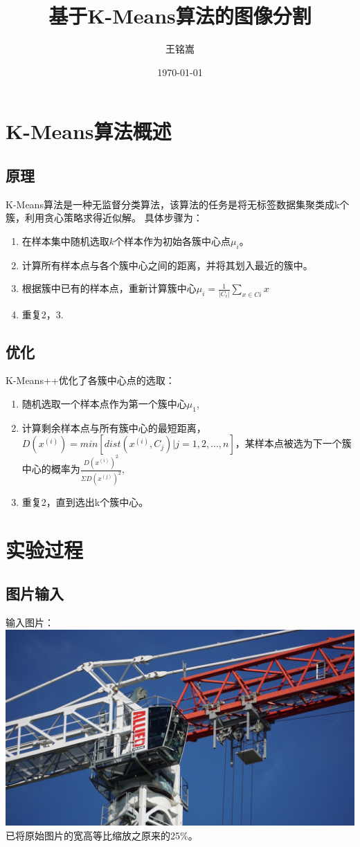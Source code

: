 \documentclass{article}
\title{基于K-Means算法的图像分割}
\author{王铭嵩}
\date{\today}
\begin{document}
\maketitle
\section{K-Means算法概述}
\subsection{原理}
K-Means算法是一种无监督分类算法，该算法的任务是将无标签数据集聚类成k个簇，利用贪心策略求得近似解。
具体步骤为：
\begin{enumerate}
    \item 在样本集中随机选取$k$个样本作为初始各簇中心点$\mu_{i}$。
    \item 计算所有样本点与各个簇中心之间的距离，并将其划入最近的簇中。
    \item 根据簇中已有的样本点，重新计算簇中心$\mu_{i}=\frac{1}{|C_{i}|}\sum_{x\in{C{i}}}x$
    \item 重复2，3.
\end{enumerate}
\subsection{优化}
K-Means++优化了各簇中心点的选取：
\begin{enumerate}
    \item 随机选取一个样本点作为第一个簇中心$\mu_1$,
    \item 计算剩余样本点与所有簇中心的最短距离，$D(x^{(i)})=min[dist(x^{(i)},C_j)|j=1,2,...,n]$，某样本点被选为下一个簇中心的概率为$\frac{D(x^{(i)})^2}{\Sigma D(x^{(j)})^2}$,
    \item 重复2，直到选出k个簇中心。
\end{enumerate}
\section{实验过程}
\subsection{图片输入}
输入图片：\\
\includegraphics[width=1.0\textwidth]{../python/crane.jpg}\\
已将原始图片的宽高等比缩放之原来的25\%。
\end{document}
